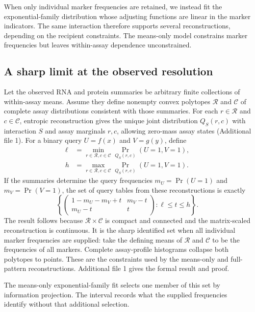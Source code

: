 \documentclass[pdflatex,sn-vancouver-num,iicol]{sn-jnl}
\begin{document}
When only individual marker frequencies are retained, we instead fit the
exponential-family distribution whose adjusting functions are linear in the
marker indicators. The same interaction therefore supports several
reconstructions, depending on the recipient constraints. The means-only model
constrains marker frequencies but leaves within-assay dependence unconstrained.

\subsection{A sharp limit at the observed resolution}
Let the observed RNA and protein summaries be arbitrary finite collections of
within-assay means. Assume they define nonempty convex polytopes $\mathcal R$ and $\mathcal C$
of complete assay distributions consistent with those summaries. For each
$r\in\mathcal R$ and $c\in\mathcal C$, entropic reconstruction gives the unique
joint distribution $Q_S(r,c)$ with interaction $S$ and assay marginals $r,c$,
allowing zero-mass assay states (Additional file 1).
For a binary query $U=f(x)$ and $V=g(y)$, define
\begin{align*}
 \ell&=\min_{r\in\mathcal R,c\in\mathcal C}
       \Pr_{Q_S(r,c)}(U=1,V=1),\\
 h&=\max_{r\in\mathcal R,c\in\mathcal C}
       \Pr_{Q_S(r,c)}(U=1,V=1).
\end{align*}
If the summaries determine the query frequencies
$m_U=\Pr(U=1)$ and $m_V=\Pr(V=1)$, the set of query tables from these reconstructions is
exactly
\begin{equation}
 \left\{
 \begin{pmatrix}1-m_U-m_V+t&m_V-t\\m_U-t&t\end{pmatrix}:
 \ell\leq t\leq h
 \right\}.
 \label{eq:all-marker-interval}
\end{equation}
The result follows because $\mathcal R\times\mathcal C$ is compact and
connected and the matrix-scaled reconstruction is continuous. It is the sharp
identified set when all individual marker frequencies are supplied: take the
defining means of $\mathcal R$ and $\mathcal C$ to be the frequencies of all
markers. Complete assay-profile histograms collapse both polytopes to points.
These are the constraints used by the means-only and full-pattern
reconstructions. Additional file 1 gives the formal result and proof.

The means-only exponential-family fit selects one member of this set by
information projection. The interval records what the supplied frequencies
identify without that additional selection.
\end{document}
